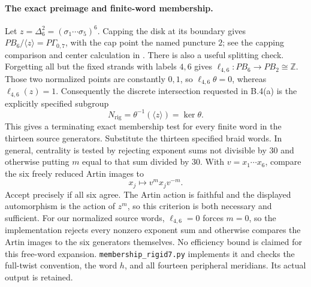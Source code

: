\paragraph{The exact preimage and finite-word membership.}
Let $z=\Delta_6^2=(\sigma_1\cdots\sigma_5)^6$.
Capping the disk at its boundary gives
$PB_6/\langle z\rangle=P\Gamma_{0,7}$, with the cap point
the named puncture $2$; see the capping comparison and center
calculation in \citet[Sections 2.2 and 4.3]{DE_GonzalezMeneses2011}.
There is also a useful splitting check.  Forgetting all but the
fixed strands with labels $4,6$ gives
$\ell_{4,6}:PB_6\to PB_2\cong\mathbb Z$.
Those two normalized points are constantly $0,1$, so
$\ell_{4,6}\theta=0$, whereas $\ell_{4,6}(z)=1$.
Consequently the discrete intersection requested in B.4(a) is
the explicitly specified subgroup
\[
                 N_{\mathrm{rig}}=\theta^{-1}(\langle z\rangle)=\ker\theta.
 \tag{B.56.7}
\]
This gives a terminating exact membership test for every finite
word in the thirteen source generators.  Substitute the thirteen
specified braid words.  In general, centrality is tested by
rejecting exponent sums not divisible by $30$ and otherwise
putting $m$ equal to that sum divided by $30$.
With $v=x_1\cdots x_6$, compare the six freely reduced Artin
images to
\[
                       x_j\longmapsto v^m x_jv^{-m}.
\]
Accept precisely if all six agree.  The Artin action is faithful
and the displayed automorphism is the action of $z^m$, so this
criterion is both necessary and sufficient.  For our normalized
source words, $\ell_{4,6}=0$ forces $m=0$, so the implementation
rejects every nonzero exponent sum and otherwise compares
the Artin images to the six generators themselves.
No efficiency bound
is claimed for this free-word expansion.
\texttt{membership\_rigid7.py} implements it and checks the
full-twist convention, the word $h$, and all fourteen peripheral
meridians.  Its actual output is retained.

